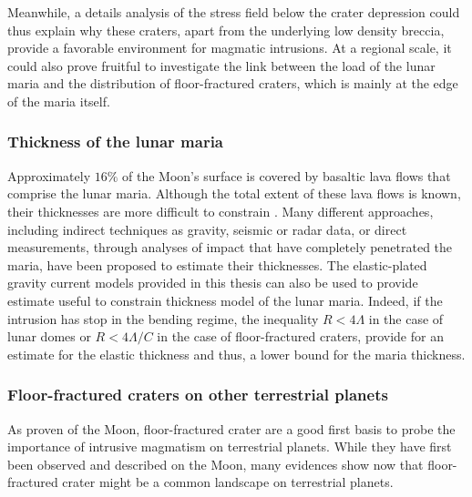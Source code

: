 Meanwhile, a  details analysis  of the stress  field below  the crater
depression  could  thus explain  why  these  craters, apart  from  the
underlying low  density breccia,  provide a favorable  environment for
magmatic  intrusions.   At  a  regional scale,  it  could  also  prove
fruitful to investigate  the link between the load of  the lunar maria
and the  distribution of floor-fractured  craters, which is  mainly at
the edge of the maria itself.

\subsubsection*{Thickness of the lunar maria}
\label{sec:crust-magm-intr}

Approximately $16\%$ of the Moon's surface is covered by basaltic lava
flows  that comprise  the lunar  maria. Although  the total  extent of
these lava  flows is  known, their thicknesses  are more  difficult to
constrain \citep{Thomson:2009eo}. Many different approaches, including
indirect  techniques as  gravity,  seismic or  radar  data, or  direct
measurements,  through   analyses  of  impact  that   have  completely
penetrated   the  maria,   have  been   proposed  to   estimate  their
thicknesses.  The  elastic-plated gravity  current models  provided in
this thesis can  also be used to provide estimate  useful to constrain
thickness model of the lunar maria.  Indeed, if the intrusion has stop
in the  bending regime, the  inequality $R<  4\Lambda$ in the  case of
lunar domes or $R<4\Lambda/C$ in  the case of floor-fractured craters,
provide for  an estimate for the  elastic thickness and thus,  a lower
bound for the maria thickness.

\subsubsection*{Floor-fractured craters on other terrestrial planets}

As proven of  the Moon, floor-fractured crater are a  good first basis
to probe the importance of intrusive magmatism on terrestrial planets.
While they  have first been observed  and described on the  Moon, many
evidences  show now  that  floor-fractured crater  might  be a  common
landscape on terrestrial planets.

